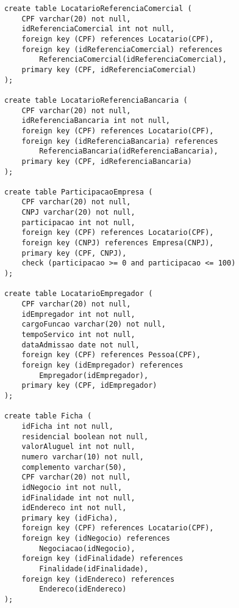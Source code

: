 \documentclass{article}
\begin{document}
\begin{lstlisting}
            create table LocatarioReferenciaComercial (
            	CPF varchar(20) not null,
            	idReferenciaComercial int not null,
            	foreign key (CPF) references Locatario(CPF),
            	foreign key (idReferenciaComercial) references 
            	    ReferenciaComercial(idReferenciaComercial),
            	primary key (CPF, idReferenciaComercial)
            );
            
            create table LocatarioReferenciaBancaria (
            	CPF varchar(20) not null,
            	idReferenciaBancaria int not null,
            	foreign key (CPF) references Locatario(CPF),
            	foreign key (idReferenciaBancaria) references 
            	    ReferenciaBancaria(idReferenciaBancaria),
            	primary key (CPF, idReferenciaBancaria)
            );
            
            create table ParticipacaoEmpresa (
            	CPF varchar(20) not null,
            	CNPJ varchar(20) not null,
            	participacao int not null,
            	foreign key (CPF) references Locatario(CPF),
            	foreign key (CNPJ) references Empresa(CNPJ),
            	primary key (CPF, CNPJ),
            	check (participacao >= 0 and participacao <= 100)
            );
            
            create table LocatarioEmpregador (
            	CPF varchar(20) not null,
            	idEmpregador int not null,
            	cargoFuncao varchar(20) not null,
            	tempoServico int not null,
            	dataAdmissao date not null,
            	foreign key (CPF) references Pessoa(CPF),
            	foreign key (idEmpregador) references 
            	    Empregador(idEmpregador),
            	primary key (CPF, idEmpregador)
            );
            
            create table Ficha (
            	idFicha int not null,
            	residencial boolean not null,
            	valorAluguel int not null,
            	numero varchar(10) not null,
            	complemento varchar(50),
            	CPF varchar(20) not null,
            	idNegocio int not null,
            	idFinalidade int not null,
            	idEndereco int not null,
            	primary key (idFicha),
            	foreign key (CPF) references Locatario(CPF),
            	foreign key (idNegocio) references 
            	    Negociacao(idNegocio),
            	foreign key (idFinalidade) references 
            	    Finalidade(idFinalidade),
            	foreign key (idEndereco) references 
            	    Endereco(idEndereco)
            );
            

\end{lstlisting}
\end{document}
